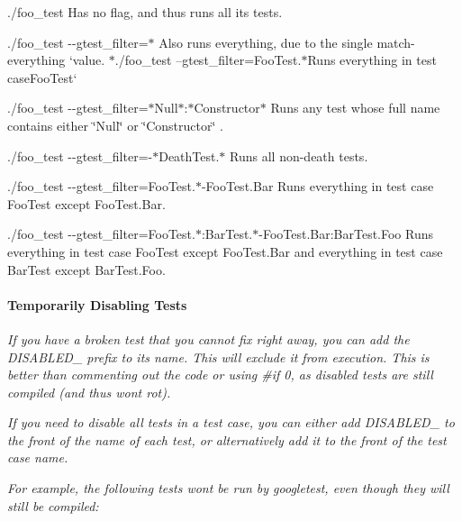 {\itshape 
\begin{DoxyItemize}
\item {\ttfamily ./foo\+\_\+test} Has no flag, and thus runs all its tests.
\item {\ttfamily ./foo\+\_\+test -\/-\/gtest\+\_\+filter=$\ast$} Also runs everything, due to the single match-\/everything `{\ttfamily value. $\ast$}./foo\+\_\+test --gtest\+\_\+filter=Foo\+Test.$\ast${\ttfamily Runs everything in test case}Foo\+Test`
\item {\ttfamily ./foo\+\_\+test -\/-\/gtest\+\_\+filter=$\ast$\+Null$\ast$\+:$\ast$\+Constructor$\ast$} Runs any test whose full name contains either {\ttfamily \char`\"{}\+Null\char`\"{}} or {\ttfamily \char`\"{}\+Constructor\char`\"{}} .
\item {\ttfamily ./foo\+\_\+test -\/-\/gtest\+\_\+filter=-\/$\ast$\+Death\+Test.$\ast$} Runs all non-\/death tests.
\item {\ttfamily ./foo\+\_\+test -\/-\/gtest\+\_\+filter=Foo\+Test.$\ast$-\/\+Foo\+Test.Bar} Runs everything in test case {\ttfamily Foo\+Test} except {\ttfamily Foo\+Test.\+Bar}.
\item {\ttfamily ./foo\+\_\+test -\/-\/gtest\+\_\+filter=Foo\+Test.$\ast$\+:Bar\+Test.$\ast$-\/\+Foo\+Test.Bar\+:Bar\+Test.\+Foo} Runs everything in test case {\ttfamily Foo\+Test} except {\ttfamily Foo\+Test.\+Bar} and everything in test case {\ttfamily Bar\+Test} except {\ttfamily Bar\+Test.\+Foo}.
\end{DoxyItemize}}

{\itshape \paragraph*{Temporarily Disabling Tests}}

{\itshape }

{\itshape If you have a broken test that you cannot fix right away, you can add the {\ttfamily D\+I\+S\+A\+B\+L\+E\+D\+\_\+} prefix to its name. This will exclude it from execution. This is better than commenting out the code or using {\ttfamily \#if 0}, as disabled tests are still compiled (and thus won\textquotesingle{}t rot).}

{\itshape If you need to disable all tests in a test case, you can either add {\ttfamily D\+I\+S\+A\+B\+L\+E\+D\+\_\+} to the front of the name of each test, or alternatively add it to the front of the test case name.}

{\itshape For example, the following tests won\textquotesingle{}t be run by googletest, even though they will still be compiled\+:}

